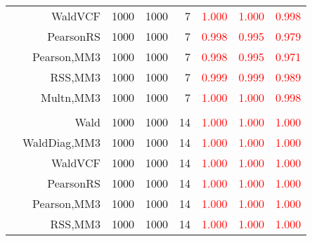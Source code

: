 \documentclass[
]{article}
\begin{document}
\begin{table}[H]
{\begin{tabular}[t]{lrrrrrrr}
\hspace{1em} & WaldVCF & 1000 & 1000 & 7 & \textcolor{red}{1.000} & \textcolor{red}{1.000} & \textcolor{red}{0.998}\\

\hspace{1em} & PearsonRS & 1000 & 1000 & 7 & \textcolor{red}{0.998} & \textcolor{red}{0.995} & \textcolor{red}{0.979}\\

\hspace{1em} & Pearson,MM3 & 1000 & 1000 & 7 & \textcolor{red}{0.998} & \textcolor{red}{0.995} & \textcolor{red}{0.971}\\

\hspace{1em} & RSS,MM3 & 1000 & 1000 & 7 & \textcolor{red}{0.999} & \textcolor{red}{0.999} & \textcolor{red}{0.989}\\

\hspace{1em} & Multn,MM3 & 1000 & 1000 & 7 & \textcolor{red}{1.000} & \textcolor{red}{1.000} & \textcolor{red}{0.998}\\
\cmidrule{1-8}
\addlinespace[0.3em]
\multicolumn{8}{l}{\textbf{1F 15V}}\\
\hspace{1em} & Wald & 1000 & 1000 & 14 & \textcolor{red}{1.000} & \textcolor{red}{1.000} & \textcolor{red}{1.000}\\

\hspace{1em} & WaldDiag,MM3 & 1000 & 1000 & 14 & \textcolor{red}{1.000} & \textcolor{red}{1.000} & \textcolor{red}{1.000}\\

\hspace{1em} & WaldVCF & 1000 & 1000 & 14 & \textcolor{red}{1.000} & \textcolor{red}{1.000} & \textcolor{red}{1.000}\\

\hspace{1em} & PearsonRS & 1000 & 1000 & 14 & \textcolor{red}{1.000} & \textcolor{red}{1.000} & \textcolor{red}{1.000}\\

\hspace{1em} & Pearson,MM3 & 1000 & 1000 & 14 & \textcolor{red}{1.000} & \textcolor{red}{1.000} & \textcolor{red}{1.000}\\

\hspace{1em} & RSS,MM3 & 1000 & 1000 & 14 & \textcolor{red}{1.000} & \textcolor{red}{1.000} & \textcolor{red}{1.000}\\


\end{tabular}}
\end{table}
\end{document}
